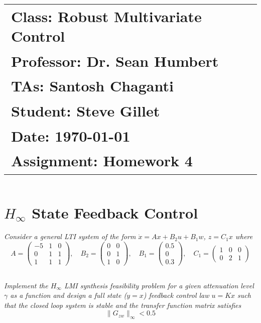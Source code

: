\documentclass[12pt, letterpaper]{article}
\begin{document}
\title{
    \begin{tabular}{@{}l@{}}
        \textbf{Class:} Robust Multivariate Control \\
        \textbf{Professor:} Dr. Sean Humbert \\
        \textbf{TAs:} Santosh Chaganti \\
        \textbf{Student:} Steve Gillet \\
        \textbf{Date:} \today \\
        \textbf{Assignment:} Homework 4
    \end{tabular}
}

\author{}
\date{}

\maketitle

\section{$H_\infty$ State Feedback Control}
\textit{Consider a general LTI system of the form $\dot{x} = Ax + B_2u + B_1w$, $z = C_1x$ where
\[
A = \begin{pmatrix}
-5 & 1 & 0 \\
0 & 1 & 1 \\
1 & 1 & 1
\end{pmatrix}, \quad
B_2 = \begin{pmatrix}
0 & 0 \\
0 & 1 \\
1 & 0
\end{pmatrix}, \quad
B_1 = \begin{pmatrix}
0.5 \\
0 \\
0.3
\end{pmatrix}, \quad
C_1 = \begin{pmatrix}
1 & 0 & 0 \\
0 & 2 & 1
\end{pmatrix}
\]
}

\subsection{}
\textit{
Implement the $H_\infty$ LMI synthesis feasibility problem for a given attenuation level $\gamma$ as a function and design a full state ($y = x$) feedback control law $u = Kx$ such that the closed loop system is stable and the transfer function matrix satisfies
\[
\|G_{zw}\|_\infty < 0.5
\]
}
\end{document}
